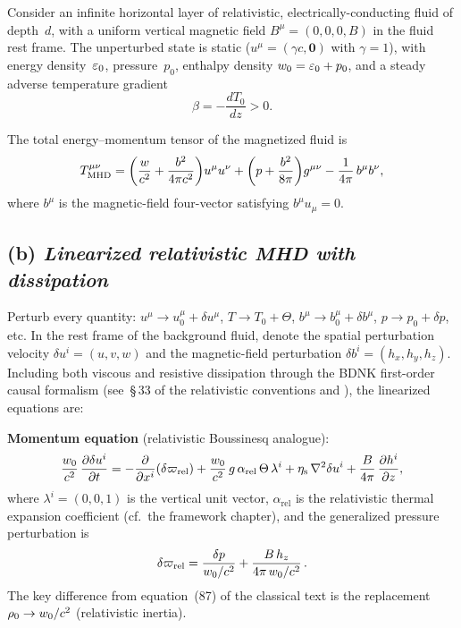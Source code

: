 Consider an infinite horizontal layer of relativistic,
electrically-conducting fluid of depth~$d$, with a uniform vertical
magnetic field $B^{\mu}=(0,0,0,B)$ in the fluid rest frame.
The unperturbed state is static ($u^{\mu}=(\gamma c,\mathbf{0})$
with $\gamma=1$), with energy density~$\varepsilon_{0}$,
pressure~$p_{0}$, enthalpy density $w_{0}=\varepsilon_{0}+p_{0}$,
and a steady adverse temperature gradient
\begin{equation}\label{eq:rel-beta}
  \beta = -\frac{dT_{0}}{dz}>0.
\end{equation}

The total energy--momentum tensor of the magnetized fluid is
\begin{equation}\label{eq:rel-Tmunu-MHD}
  T^{\mu\nu}_{\text{MHD}}
  = \biggl(\frac{w}{c^{2}}+\frac{b^2}{4\pi c^{2}}\biggr)
    u^{\mu}u^{\nu}
  + \biggl(p+\frac{b^2}{8\pi}\biggr)g^{\mu\nu}
  - \frac{1}{4\pi}\,b^{\mu}b^{\nu},
\end{equation}
where $b^{\mu}$ is the magnetic-field four-vector satisfying
$b^{\mu}u_{\mu}=0$.

\subsection*{(b) \emph{Linearized relativistic MHD with dissipation}}

Perturb every quantity: $u^{\mu}\to u^{\mu}_{0}+\delta u^{\mu}$,
$T\to T_{0}+\Theta$, $b^{\mu}\to b^{\mu}_{0}+\delta b^{\mu}$,
$p\to p_{0}+\delta p$, etc.  In the rest frame of the background
fluid, denote the spatial perturbation velocity
$\delta u^{i}=(u,v,w)$ and the magnetic-field perturbation
$\delta b^{i}=(h_{x},h_{y},h_{z})$.  Including both viscous and
resistive dissipation through the BDNK first-order causal formalism
(see~\S\,33 of the relativistic conventions and
\citealt{BemficaDN2018,Kovtun2019}), the linearized
equations are:

\medskip
\noindent\textbf{Momentum equation} (relativistic Boussinesq analogue):
\begin{equation}\label{eq:rel-87}
  \frac{w_{0}}{c^{2}}\,\frac{\partial\delta u^{i}}{\partial t}
  = -\frac{\partial}{\partial x^{i}}(\delta\varpi_{\text{rel}})
    + \frac{w_{0}}{c^{2}}\,g\,\alpha_{\text{rel}}\,\Theta\,\lambda^{i}
    + \eta_{\mathrm{s}}\,\nabla^{2}\delta u^{i}
    + \frac{B}{4\pi}\,\frac{\partial h^{i}}{\partial z},
\end{equation}
where $\lambda^{i}=(0,0,1)$ is the vertical unit vector,
$\alpha_{\text{rel}}$ is the relativistic thermal expansion
coefficient (cf.\ the framework chapter), and the generalized
pressure perturbation is
\begin{equation}\label{eq:rel-88}
  \delta\varpi_{\text{rel}}
  = \frac{\delta p}{w_{0}/c^{2}}
    + \frac{B\,h_{z}}{4\pi\,w_{0}/c^{2}}\,.
\end{equation}
The key difference from equation~(87) of the classical text is the
replacement $\rho_{0}\to w_{0}/c^{2}$ (relativistic inertia).

